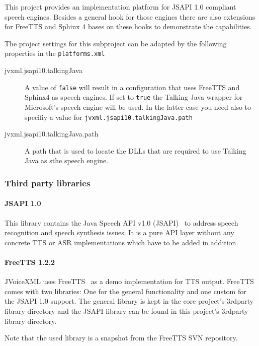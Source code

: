 \documentclass[11pt,a4paper]{article}
\begin{document}
This project provides an implementation platform for JSAPI 1.0 compliant
speech engines. Besides a general hook for those engines there are also
extensions for FreeTTS and Sphinx 4 bases on these hooks to demonstrate the
capabilities.

The project settings for this subproject can be adapted by the following
properties in the \texttt{platforms.xml}

\begin{description}
\item[jvxml.jsapi10.talkingJava] A value of \texttt{false} will result in a
configuration that uses FreeTTS and Sphinx4 as speech engines. If set to
\texttt{true} the Talking Java wrapper for Microsoft's speech engine will be
used. In the latter case you need also to specifiy a value for
\texttt{jvxml.jsapi10.talkingJava.path}
\item[jvxml.jsapi10.talkingJava.path] A path that is used to locate the DLLs
that are required to use Talking Java as sthe speech engine.
\end{description}

\subsubsection{Third party libraries}
\label{sec:jsapi10-third-party-libr}

\paragraph{JSAPI 1.0}

This library contains the Java Speech API v1.0
(JSAPI)~\cite{sun:jsapi} to address speech recognition and speech synthesis
issues. It is a pure API layer without any concrete TTS or ASR implementations
which have to be added in addition.


\paragraph{FreeTTS 1.2.2}
\label{sec:freetts}

JVoiceXML uses FreeTTS~\cite{freetts} as a demo implementation for TTS output.
FreeTTS comes with two libraries: One for the general functionality
and one custom for the JSAPI 1.0 support.
The general library is kept in the core project's 3rdparty library directory
and the JSAPI library can be found in this project's 3rdparty library directory.

Note that the used library is a snapshot from the FreeTTS SVN repository.
\end{document}
